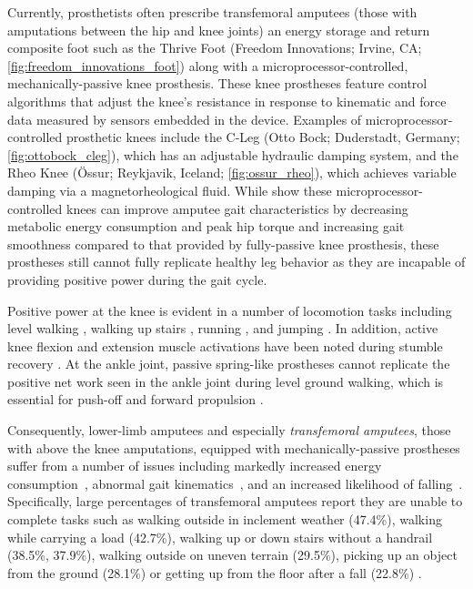 Currently, prosthetists often prescribe transfemoral amputees (those with
amputations between the hip and knee joints) an energy storage and return
composite foot such as the Thrive Foot (Freedom Innovations; Irvine, CA;
\cref{fig:freedom_innovations_foot}) along with a microprocessor-controlled,
mechanically-passive knee prosthesis. These knee prostheses feature control
algorithms that adjust the knee's resistance in response to kinematic and force
data measured by sensors embedded in the device. Examples of
microprocessor-controlled prosthetic knees include the C-Leg (Otto Bock;
Duderstadt, Germany; \cref{fig:ottobock_cleg}), which has an adjustable
hydraulic damping system, and the Rheo Knee (Össur; Reykjavik, Iceland;
\cref{fig:ossur_rheo}), which achieves variable damping via a magnetorheological
fluid. While \citet{johansson2005clinical} show these microprocessor-controlled
knees can improve amputee gait characteristics by decreasing metabolic energy
consumption and peak hip torque and increasing gait smoothness compared to that
provided by fully-passive knee prosthesis, these prostheses still cannot fully
replicate healthy leg behavior as they are incapable of providing positive power
during the gait cycle. 

Positive power at the knee is evident in a number of locomotion tasks including
level walking \citep{perry2010gait}, walking up stairs
\citep{nadeau2003frontal}, running \citep{buczek1990stance}, and jumping
\citep{hubley1983work}. In addition, active knee flexion and extension muscle
activations have been noted during stumble recovery \citep{eng1994strategies}.
At the ankle joint, passive spring-like prostheses cannot replicate the positive
net work seen in the ankle joint during level ground walking, which is essential
for push-off and forward propulsion \citep{perry2010gait}.

Consequently, lower-limb amputees and especially \emph{transfemoral amputees},
those with above the knee amputations, equipped with mechanically-passive
prostheses suffer from a number of issues including markedly increased energy
consumption~\citep{waters1976energy}, abnormal gait
kinematics~\citep{jaegers1995prosthetic}, and an increased likelihood of
falling~\citep{miller2001prevalence}. Specifically, large percentages of
transfemoral amputees report they are unable to complete tasks such as walking
outside in inclement weather (47.4\%), walking while carrying a load (42.7\%),
walking up or down stairs without a handrail (38.5\%, 37.9\%), walking outside
on uneven terrain (29.5\%), picking up an object from the ground (28.1\%) or
getting up from the floor after a fall (22.8\%) \citep{gauthier1999enabling}.

